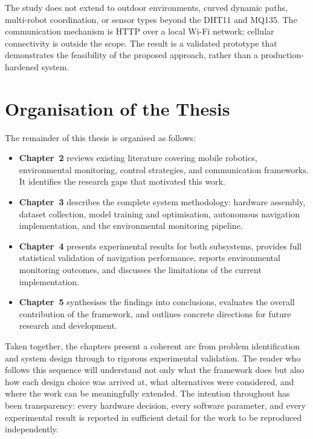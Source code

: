 The study does not extend to outdoor environments, curved dynamic paths,
multi-robot coordination, or sensor types beyond the DHT11 and MQ135.
The communication mechanism is HTTP over a local Wi-Fi network;
cellular connectivity is outside the scope. The result is a validated
prototype that demonstrates the feasibility of the proposed approach,
rather than a production-hardened system.

\section{Organisation of the Thesis}

The remainder of this thesis is organised as follows:

\begin{itemize}
    \item \textbf{Chapter~2} reviews existing literature covering
          mobile robotics, environmental monitoring, control strategies,
          and communication frameworks. It identifies the research gaps
          that motivated this work.
    \item \textbf{Chapter~3} describes the complete system methodology:
          hardware assembly, dataset collection, model training and
          optimisation, autonomous navigation implementation, and the
          environmental monitoring pipeline.
    \item \textbf{Chapter~4} presents experimental results for both
          subsystems, provides full statistical validation of navigation
          performance, reports environmental monitoring outcomes,
          and discusses the limitations of the current implementation.
    \item \textbf{Chapter~5} synthesises the findings into conclusions,
          evaluates the overall contribution of the framework, and
          outlines concrete directions for future research and
          development.
\end{itemize}

Taken together, the chapters present a coherent arc from problem
identification and system design through to rigorous experimental
validation. The reader who follows this sequence will understand not
only what the framework does but also how each design choice was
arrived at, what alternatives were considered, and where the work
can be meaningfully extended. The intention throughout has been
transparency: every hardware decision, every software parameter, and
every experimental result is reported in sufficient detail for the
work to be reproduced independently.